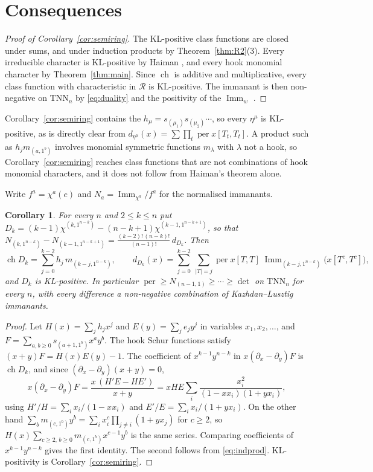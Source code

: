 \documentclass[11pt]{amsart}
\newtheorem{corollary}[theorem]{Corollary}
\theoremstyle{definition}
\theoremstyle{remark}
\newcommand{\Imm}{\operatorname{Imm}}
\newcommand{\TNN}{\mathrm{TNN}}
\newcommand{\per}{\operatorname{per}}
\DeclareMathOperator{\ch}{ch}
\begin{document}
\section{Consequences}\label{sec:consequences}

\begin{proof}[Proof of Corollary~\ref{cor:semiring}]
The KL-positive class functions are closed under sums, and under induction products by Theorem~\ref{thm:R2}(3). Every irreducible character is KL-positive by Haiman \cite[Lemma~1.1]{Hai}, and every hook monomial character by Theorem~\ref{thm:main}. Since $\ch$ is additive and multiplicative, every class function with characteristic in $\mathcal R$ is KL-positive. The immanant is then non-negative on $\TNN_n$ by \eqref{eq:duality} and the positivity of the $\Imm_w$ \cite{RS06}.
\end{proof}

Corollary~\ref{cor:semiring} contains the $h_\mu=s_{(\mu_1)}s_{(\mu_2)}\cdots$, so every $\eta^\mu$ is KL-positive, as is directly clear from $d_{\eta^\mu}(x)=\sum\prod_t\per x[T_t,T_t]$. A product such as $h_jm_{(a,1^b)}$ involves monomial symmetric functions $m_\lambda$ with $\lambda$ not a hook, so Corollary~\ref{cor:semiring} reaches class functions that are not combinations of hook monomial characters, and it does not follow from Haiman's theorem alone.

Write $f^a=\chi^a(e)$ and $N_a=\Imm_{\chi^a}/f^a$ for the normalised immanants.

\begin{corollary}\label{cor:skandera}
For every $n$ and $2\le k\le n$ put $D_k=(k-1)\chi^{(k,1^{n-k})}-(n-k+1)\chi^{(k-1,1^{n-k+1})}$, so that $N_{(k,1^{n-k})}-N_{(k-1,1^{n-k+1})}=\frac{(k-2)!\,(n-k)!}{(n-1)!}\,d_{D_k}$. Then
\[
\ch D_k=\sum_{j=0}^{k-2}h_j\,m_{(k-j,1^{n-k})},\qquad
d_{D_k}(x)=\sum_{j=0}^{k-2}\ \sum_{|T|=j}\per x[T,T]\;\Imm_{(k-j,1^{n-k})}\bigl(x[T^c,T^c]\bigr),
\]
and $D_k$ is KL-positive. In particular $\per\ge N_{(n-1,1)}\ge\cdots\ge\det$ on $\TNN_n$ for every $n$, with every difference a non-negative combination of Kazhdan--Lusztig immanants.
\end{corollary}

\begin{proof}
Let $H(x)=\sum_jh_jx^j$ and $E(y)=\sum_je_jy^j$ in variables $x_1,x_2,\dots$, and $F=\sum_{a,b\ge0}s_{(a+1,1^b)}x^ay^b$. The hook Schur functions satisfy $(x+y)F=H(x)E(y)-1$. The coefficient of $x^{k-1}y^{n-k}$ in $x(\partial_x-\partial_y)F$ is $\ch D_k$, and since $(\partial_x-\partial_y)(x+y)=0$,
\[
x(\partial_x-\partial_y)F=\frac{x\,(H'E-HE')}{x+y}=xHE\sum_i\frac{x_i^2}{(1-xx_i)(1+yx_i)},
\]
using $H'/H=\sum_ix_i/(1-xx_i)$ and $E'/E=\sum_ix_i/(1+yx_i)$. On the other hand $\sum_bm_{(c,1^b)}y^b=\sum_ix_i^c\prod_{j\ne i}(1+yx_j)$ for $c\ge2$, so $H(x)\sum_{c\ge2,\,b\ge0}m_{(c,1^b)}x^{c-1}y^b$ is the same series. Comparing coefficients of $x^{k-1}y^{n-k}$ gives the first identity. The second follows from \eqref{eq:indprod}. KL-positivity is Corollary~\ref{cor:semiring}.
\end{proof}
\end{document}

